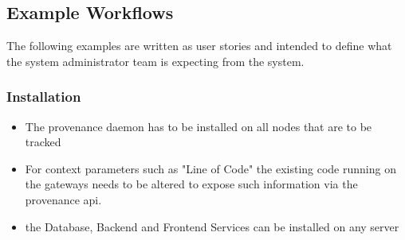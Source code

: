 


\subsection{Example Workflows}

The following examples are written as user stories and intended to define what the system administrator team is expecting from the system.

\subsubsection{Installation}
\begin{itemize}
  \item The provenance daemon has to be installed on all nodes that are to be tracked
  \item For context parameters such as "Line of Code" the existing code running on the gateways needs to be altered to expose such information via the provenance api.
  \item the Database, Backend and Frontend Services can be installed on any server
\end{itemize}

